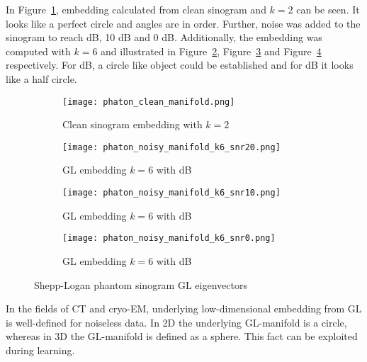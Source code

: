 In Figure~\ref{fig:clean_manifold}, embedding calculated from clean sinogram and $k=2$ can be seen.
It looks like a perfect circle and angles are in order. 
Further, noise was added to the sinogram to reach  dB, 10 dB and 0 dB. 
Additionally, the embedding was computed with $k=6$ and illustrated in Figure~\ref{fig:noisy_manifold_k6_snr20},
Figure~\ref{fig:noisy_manifold_k6_snr10} and Figure~\ref{fig:noisy_manifold_k6_snr0} respectively.
For  dB, a circle like object could be established and for  dB it looks like a half circle. 

\begin{figure}[H]
    \captionsetup[subfigure]{justification=centering}
    \centering
    \begin{subfigure}[t]{0.25\textwidth}
        \texttt{[image: phaton\_clean\_manifold.png]}
        \caption{Clean sinogram embedding with $k=2$}
        \label{fig:clean_manifold}
    \end{subfigure}\hfill
    \begin{subfigure}[t]{0.25\textwidth}
      \texttt{[image: phaton\_noisy\_manifold\_k6\_snr20.png]}
      \caption{GL embedding $k=6$ with  dB}
      \label{fig:noisy_manifold_k6_snr20}
    \end{subfigure}\hfill
    \begin{subfigure}[t]{0.25\textwidth}
      \texttt{[image: phaton\_noisy\_manifold\_k6\_snr10.png]}
      \caption{GL embedding $k=6$ with  dB}
      \label{fig:noisy_manifold_k6_snr10}
    \end{subfigure}\hfill
    \begin{subfigure}[t]{0.25\textwidth}
      \texttt{[image: phaton\_noisy\_manifold\_k6\_snr0.png]}
      \caption{GL embedding $k=6$ with  dB}
      \label{fig:noisy_manifold_k6_snr0}
    \end{subfigure}
    \caption{Shepp-Logan phantom sinogram GL eigenvectors}
    \label{fig:phantom_manifolds}
  \end{figure}

\begin{tcolorbox}[colback=red!5!white,colframe=red!75!black]
    In the fields of CT and cryo-EM, underlying low-dimensional embedding from GL is well-defined for noiseless data.
    In 2D the underlying GL-manifold is a circle, whereas in 3D the GL-manifold is defined as a sphere.
    This fact can be exploited during learning.
\end{tcolorbox}

